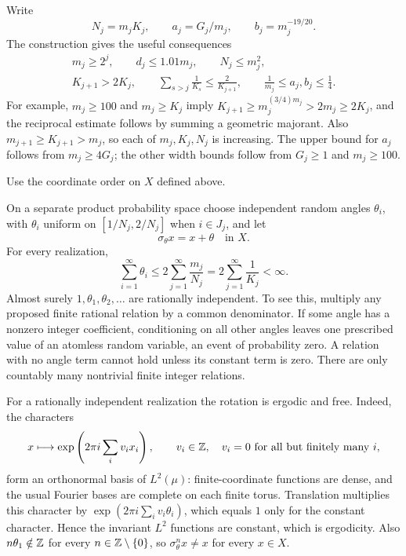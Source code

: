 Write
\begin{equation}\label{p:eq:N-and-widths}
 N_j=m_jK_j,\qquad a_j=G_j/m_j,\qquad b_j=m_j^{-19/20}.
\end{equation}
The construction gives the useful consequences
\begin{equation}\label{p:eq:scale-consequences}
 \begin{gathered}
 m_j\ge2^j,\qquad d_j\le1.01m_j,\qquad N_j\le m_j^2,\\
 K_{j+1}>2K_j,\qquad
 \sum_{s>j}\frac1{K_s}\le\frac2{K_{j+1}},\qquad
 \frac1{m_j}\le a_j,b_j\le\frac14.
 \end{gathered}
\end{equation}
For example, $m_j\ge100$ and $m_j\ge K_j$ imply
$K_{j+1}\ge m_j^{(3/4)m_j}>2m_j\ge2K_j$, and the reciprocal
estimate follows by summing a geometric majorant.  Also
$m_{j+1}\ge K_{j+1}>m_j$, so each of $m_j,K_j,N_j$ is increasing.
The upper bound for $a_j$ follows from $m_j\ge4G_j$; the other width
bounds follow from $G_j\ge1$ and $m_j\ge100$.

Use the coordinate order on $X$ defined above.

On a separate product probability space choose independent random
angles $\theta_i$, with $\theta_i$ uniform on $[1/N_j,2/N_j]$ when
$i\in J_j$, and let
\[
 \sigma_\theta x=x+\theta\quad\text{in }X.
\]
For every realization,
\begin{equation}\label{p:eq:angle-summability}
 \sum_{i=1}^\infty\theta_i
 \le2\sum_{j=1}^\infty\frac{m_j}{N_j}
 =2\sum_{j=1}^\infty\frac1{K_j}<\infty.
\end{equation}
Almost surely $1,\theta_1,\theta_2,\ldots$ are rationally independent.
To see this, multiply any proposed finite rational relation by a
common denominator.  If some angle has a nonzero integer coefficient,
conditioning on all other angles leaves one prescribed value of an
atomless random variable, an event of probability zero.  A relation
with no angle term cannot hold unless its constant term is zero.
There are only countably many nontrivial finite integer relations.

For a rationally independent realization the rotation is ergodic
and free.  Indeed, the characters
\[
 x\longmapsto\exp\left(2\pi i\sum_i v_ix_i\right),
 \qquad v_i\in\mathbb Z,\quad v_i=0\text{ for all but finitely many }i,
\]
form an orthonormal basis of $L^2(\mu)$: finite-coordinate functions
are dense, and the usual Fourier bases are complete on each finite
torus.  Translation multiplies this character by
$\exp(2\pi i\sum_i v_i\theta_i)$, which equals $1$ only for the
constant character.  Hence the invariant $L^2$ functions are constant,
which is ergodicity.  Also $n\theta_1\notin\mathbb Z$ for every
$n\in\mathbb Z\setminus\{0\}$, so $\sigma_\theta^n x\ne x$ for every
$x\in X$.

